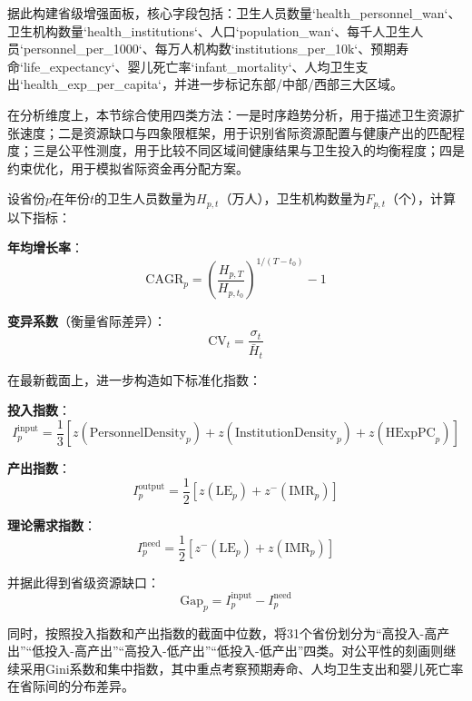 \documentclass[12pt,a4paper]{ctexart}
\begin{document}
据此构建省级增强面板，核心字段包括：卫生人员数量`health\_personnel\_wan`、卫生机构数量`health\_institutions`、人口`population\_wan`、每千人卫生人员`personnel\_per\_1000`、每万人机构数`institutions\_per\_10k`、预期寿命`life\_expectancy`、婴儿死亡率`infant\_mortality`、人均卫生支出`health\_exp\_per\_capita`，并进一步标记东部/中部/西部三大区域。

在分析维度上，本节综合使用四类方法：一是时序趋势分析，用于描述卫生资源扩张速度；二是资源缺口与四象限框架，用于识别省际资源配置与健康产出的匹配程度；三是公平性测度，用于比较不同区域间健康结果与卫生投入的均衡程度；四是约束优化，用于模拟省际资金再分配方案。

设省份$p$在年份$t$的卫生人员数量为$H_{p,t}$（万人），卫生机构数量为$F_{p,t}$（个），计算以下指标：

\textbf{年均增长率}：
\begin{equation}
    \text{CAGR}_p = \left(\frac{H_{p, T}}{H_{p, t_0}}\right)^{1/(T - t_0)} - 1
\end{equation}

\textbf{变异系数}（衡量省际差异）：
\begin{equation}
    \text{CV}_t = \frac{\sigma_t}{\bar{H}_t}
\end{equation}

在最新截面上，进一步构造如下标准化指数：

\textbf{投入指数}：
\begin{equation}
    I_p^{\text{input}} = \frac{1}{3}\left[z(\text{PersonnelDensity}_p) + z(\text{InstitutionDensity}_p) + z(\text{HExpPC}_p)\right]
\end{equation}

\textbf{产出指数}：
\begin{equation}
    I_p^{\text{output}} = \frac{1}{2}\left[z(\text{LE}_p) + z^{-}(\text{IMR}_p)\right]
\end{equation}

\textbf{理论需求指数}：
\begin{equation}
    I_p^{\text{need}} = \frac{1}{2}\left[z^{-}(\text{LE}_p) + z(\text{IMR}_p)\right]
\end{equation}

并据此得到省级资源缺口：
\begin{equation}
    \text{Gap}_p = I_p^{\text{input}} - I_p^{\text{need}}
\end{equation}

同时，按照投入指数和产出指数的截面中位数，将31个省份划分为“高投入-高产出”“低投入-高产出”“高投入-低产出”“低投入-低产出”四类。对公平性的刻画则继续采用Gini系数和集中指数，其中重点考察预期寿命、人均卫生支出和婴儿死亡率在省际间的分布差异。
\end{document}
